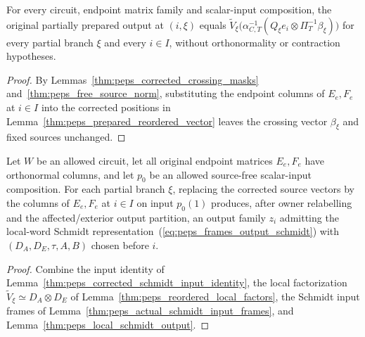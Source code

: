 \begin{lemma}
    \label{thm:peps_corrected_schmidt_input_identity}
    \leanok
    For every circuit, endpoint matrix family and scalar-input composition,
    the original partially prepared output at $(i,\xi)$ equals
    $\widetilde V_\xi\bigl(\alpha_{C,T}^{-1}(Q_\xi e_i\otimes\Pi_T^{-1}\beta_\xi)\bigr)$
    for every partial branch $\xi$ and every $i\in I$, without orthonormality or contraction hypotheses.
\end{lemma}
\begin{proof}
    \leanok
    By Lemmas~\ref{thm:peps_corrected_crossing_masks} and~\ref{thm:peps_free_source_norm}, substituting the endpoint columns of $E_e,F_e$ at $i\in I$ into the corrected positions in Lemma~\ref{thm:peps_prepared_reordered_vector} leaves the crossing vector $\beta_\xi$ and fixed sources unchanged.
\end{proof}

\begin{lemma}
    \label{thm:peps_actual_corrected_schmidt_output}
    \leanok
    Let $W$ be an allowed circuit, let all original endpoint matrices $E_e,F_e$ have
    orthonormal columns, and let $p_0$ be an allowed source-free scalar-input composition. For each partial branch $\xi$, replacing the corrected source vectors by the columns of $E_e,F_e$ at
    $i\in I$ on input $p_0(1)$ produces, after owner
    relabelling and the affected/exterior output partition, an output family $z_i$ admitting the local-word Schmidt representation~(\ref{eq:peps_frames_output_schmidt}) with $(D_A,D_E,\tau,A,B)$ chosen before $i$.
\end{lemma}
\begin{proof}
    \leanok
    Combine the input identity of Lemma~\ref{thm:peps_corrected_schmidt_input_identity}, the local factorization $\widetilde V_\xi\simeq D_A\otimes D_E$ of Lemma~\ref{thm:peps_reordered_local_factors}, the Schmidt input frames of Lemma~\ref{thm:peps_actual_schmidt_input_frames}, and Lemma~\ref{thm:peps_local_schmidt_output}.
\end{proof}
